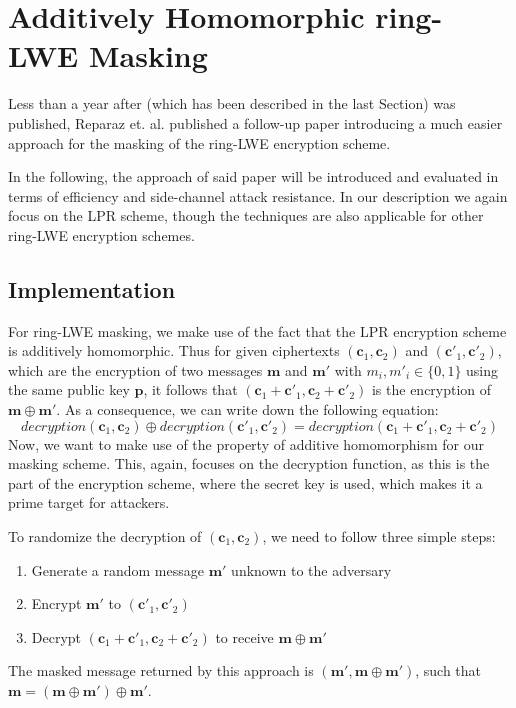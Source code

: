 \chapter{Additively Homomorphic ring-LWE Masking}
Less than a year after \cite{maskedRing} (which has been described in the last Section) was published, Reparaz et. al. published a follow-up paper \cite{Reparaz2016} introducing a much easier approach for the masking of the \ac{ring-LWE} encryption scheme.

In the following, the approach of said paper will be introduced and evaluated in terms of efficiency and side-channel attack resistance. In our description we again focus on the \ac{LPR} scheme, though the techniques are also applicable for other \ac{ring-LWE} encryption schemes.

\section{Implementation}
For \ac{ring-LWE} masking, we make use of the fact that the \ac{LPR} encryption scheme is additively homomorphic. Thus for given ciphertexts \((\textbf{c}_1, \textbf{c}_2)\) and \((\textbf{c}'_1, \textbf{c}'_2)\), which are the encryption of two messages \(\textbf{m}\) and \(\textbf{m}'\) with \(m_i, m'_i \in \{0,1\}\) using the same public key \(\textbf{p}\), it follows that \((\textbf{c}_1+\textbf{c}'_1, \textbf{c}_2+\textbf{c}'_2)\) is the encryption of \(\textbf{m} \oplus \textbf{m}'\). As a consequence, we can write down the following equation:
\begin{equation}
	decryption(\textbf{c}_1,\textbf{c}_2) \oplus decryption(\textbf{c}'_1,\textbf{c}'_2) = decryption(\textbf{c}_1 + \textbf{c}'_1,\textbf{c}_2 + \textbf{c}'_2)
\end{equation}
Now, we want to make use of the property of additive homomorphism for our masking scheme. This, again, focuses on the decryption function, as this is the part of the encryption scheme, where the secret key is used, which makes it a prime target for attackers.

To randomize the decryption of \((\textbf{c}_1, \textbf{c}_2)\), we need to follow three simple steps:
\begin{enumerate}
\item Generate a random message \(\textbf{m}'\) unknown to the adversary
\item Encrypt \(\textbf{m}'\) to \((\textbf{c}'_1, \textbf{c}'_2)\)
\item Decrypt \((\textbf{c}_1+\textbf{c}'_1, \textbf{c}_2+\textbf{c}'_2)\) to receive \(\textbf{m} \oplus \textbf{m}'\)
\end{enumerate}
The masked message returned by this approach is \((\textbf{m}', \textbf{m} \oplus \textbf{m}')\), such that \(\textbf{m} = (\textbf{m} \oplus \textbf{m}') \oplus \textbf{m}'\).

